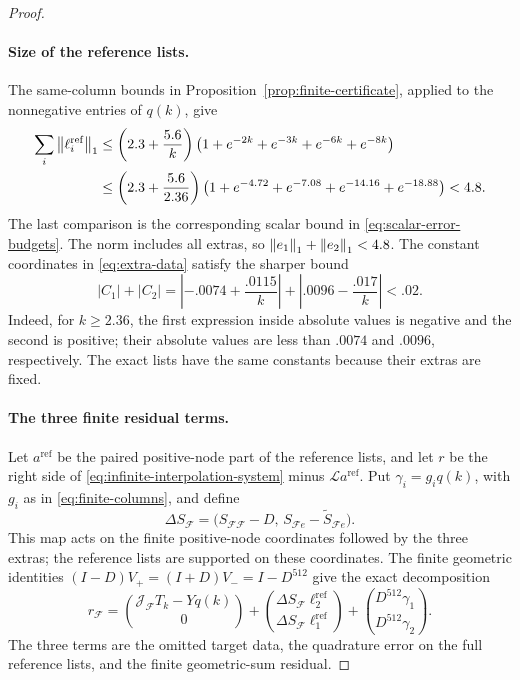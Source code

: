 \begin{proof}
\paragraph{Size of the reference lists.}
The same-column bounds in Proposition~\ref{prop:finite-certificate}, applied
to the nonnegative entries of \(q(k)\), give
\begin{align}
 \sum_i\left\lVert\ell_i^{\mathrm{ref}}\right\rVert_1
 &\le\left(2.3+\frac{5.6}{k}\right)
       \left(1+e^{-2k}+e^{-3k}+e^{-6k}+e^{-8k}\right)\notag\\
 &\le\left(2.3+\frac{5.6}{2.36}\right)
       \left(1+e^{-4.72}+e^{-7.08}+e^{-14.16}+e^{-18.88}\right)
 <4.8.
 \label{eq:reference-norm}
\end{align}
The last comparison is the corresponding scalar bound in
\eqref{eq:scalar-error-budgets}.  The norm includes all extras, so
\(\left\lVert e_1\right\rVert_1+\left\lVert e_2\right\rVert_1<4.8\).  The constant coordinates in
\eqref{eq:extra-data} satisfy the sharper bound
\begin{equation}
 |C_1|+|C_2|
 =\left|-.0074+\frac{.0115}{k}\right|
  +\left|.0096-\frac{.017}{k}\right|<.02.
 \label{eq:extra-constant-bound}
\end{equation}
Indeed, for \(k\ge2.36\), the first expression inside absolute values is
negative and the second is positive; their absolute values are less than
\(.0074\) and \(.0096\), respectively.  The exact lists have the same
constants because their extras are fixed.

\paragraph{The three finite residual terms.}
Let \(a^{\mathrm{ref}}\) be the paired positive-node part of the reference
lists, and let \(r\) be the right side of
\eqref{eq:infinite-interpolation-system} minus \(\mathcal L a^{\mathrm{ref}}\).
Put \(\gamma_i=g_iq(k)\), with \(g_i\) as in
\eqref{eq:finite-columns}, and define
\[
 \Delta S_{\mathcal F}
 =\bigl(S_{\mathcal F\mathcal F}-D,\,
        S_{\mathcal F e}-\widetilde S_{\mathcal F e}\bigr).
\]
This map acts on the finite positive-node coordinates followed by the three
extras; the reference lists are supported on these coordinates.  The finite
geometric identities \((I-D)V_+=(I+D)V_-=I-D^{512}\) give the exact
decomposition
\begin{equation}\label{eq:finite-residual-decomposition}
 r_{\mathcal F}
 =\binom{\mathcal J_{\mathcal F}T_k-Yq(k)}{0}
  +\binom{\Delta S_{\mathcal F}\ell_2^{\mathrm{ref}}}
         {\Delta S_{\mathcal F}\ell_1^{\mathrm{ref}}}
  +\binom{D^{512}\gamma_1}{D^{512}\gamma_2}.
\end{equation}
The three terms are the omitted target data, the quadrature error on the
full reference lists, and the finite geometric-sum residual.


\end{proof}
